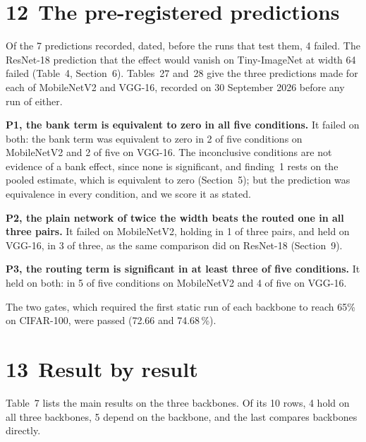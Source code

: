 \documentclass{article}
\begin{document}
\section*{12 The pre-registered predictions}

Of the 7 predictions recorded, dated, before the runs that test
them, 4 failed. The ResNet-18 prediction that the effect
would vanish on Tiny-ImageNet at width 64 failed (Table~4,
Section~6). Tables~27 and~28
give the three predictions made for each of MobileNetV2 and VGG-16,
recorded on 30 September 2026 before any run of either.

\textbf{P1, the bank term is equivalent to zero in all five
conditions.}  It failed on both: the bank term was equivalent to zero in
2 of five conditions on MobileNetV2 and 2 of five on VGG-16.
The inconclusive conditions are not evidence of a bank effect, since none
is significant, and finding~1 rests on the pooled estimate, which is
equivalent to zero (Section~5); but the prediction was
equivalence in every condition, and we score it as stated.

\textbf{P2, the plain network of twice the width beats the routed one
in all three pairs.}  It failed on MobileNetV2, holding in 1 of three
pairs, and held on VGG-16, in 3 of three, as the same comparison
did on ResNet-18 (Section~9).

\textbf{P3, the routing term is significant in at least three of five
conditions.}  It held on both: in 5 of five conditions on
MobileNetV2 and 4 of five on VGG-16.

The two gates, which required the first static run of each backbone to
reach 65\% on CIFAR-100, were passed (72.66 and
74.68\,\%).

\section*{13 Result by result}

Table~7 lists the main results on the three backbones. Of
its 10 rows, 4 hold on all three backbones,
5 depend on the backbone, and the last compares backbones
directly.
\end{document}
